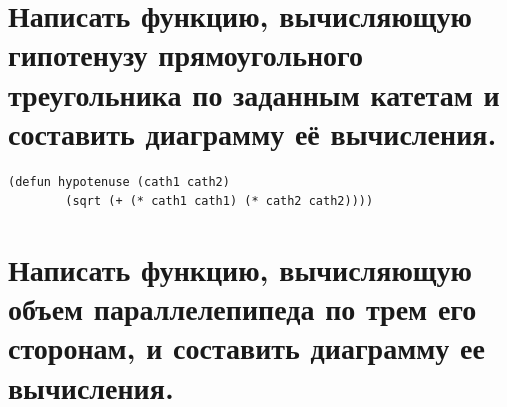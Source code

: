 \section{Написать функцию, вычисляющую гипотенузу прямоугольного треугольника по заданным катетам и составить диаграмму её вычисления.}

\begin{lstlisting}[label=lst:task_2, caption=Задание 2.]
	(defun hypotenuse (cath1 cath2) 
		(sqrt (+ (* cath1 cath1) (* cath2 cath2))))
\end{lstlisting}

\begin{figure}[H]
\end{figure}

\newpage
\section{Написать функцию, вычисляющую объем параллелепипеда по трем его сторонам, и составить диаграмму ее вычисления.}

